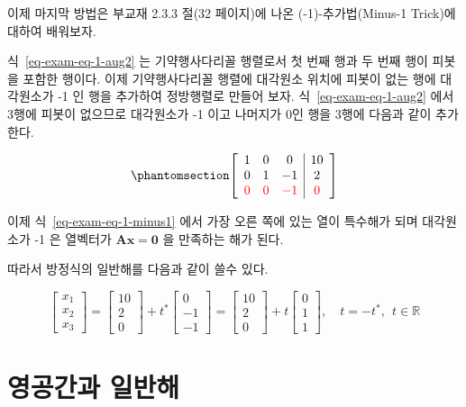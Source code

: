 \documentclass[
  11pt,
  a4paper,
  oneside]{scrbook}
\newcommand{\RR}{\mathbb{R}}
\theoremstyle{definition}
\theoremstyle{definition}
\theoremstyle{plain}
\theoremstyle{remark}
\begin{document}
이제 마지막 방법은 부교재 2.3.3 절(32 페이지)에 나온 (-1)-추가법(Minus-1
Trick)에 대하여 배워보자.

식~\ref{eq-exam-eq-1-aug2} 는 기약행사다리꼴 행렬로서 첫 번째 행과 두
번째 행이 피봇을 포함한 행이다. 이제 기약행사다리꼴 행렬에 대각원소
위치에 피봇이 없는 행에 대각원소가 -1 인 행을 추가하여 정방행렬로 만들어
보자. 식~\ref{eq-exam-eq-1-aug2} 에서 3행에 피봇이 없으므로 대각원소가
-1 이고 나머지가 0인 행을 3행에 다음과 같이 추가한다.

\begin{equation}\phantomsection\label{eq-exam-eq-1-minus1}{
\left[\begin{array}{ccc|c}
1 & 0 & 0 & 10\\
0 & 1  & -1 & 2 \\
\color{red}{0} &  \color{red}{0} & \color{red}{-1} & \color{red}{0} 
\end{array}\right]
}\end{equation}

이제 식~\ref{eq-exam-eq-1-minus1} 에서 가장 오른 쪽에 있는 열이 특수해가
되며 대각원소가 -1 은 열벡터가 \(\pmb A \pmb x = \pmb 0\) 을 만족하는
해가 된다.

따라서 방정식의 일반해를 다음과 같이 쓸수 있다.

\[
\begin{bmatrix}
x_1 \\
x_2 \\
x_3 
\end{bmatrix}
=
\begin{bmatrix}
10 \\
2 \\
0 
\end{bmatrix}+
t^*
\begin{bmatrix}
0 \\
-1 \\
-1 
\end{bmatrix}
=
\begin{bmatrix}
10 \\
2 \\
0 
\end{bmatrix}+
t
\begin{bmatrix}
0 \\
1 \\
1 
\end{bmatrix},
 \quad t=-t^*, ~~ t \in \RR
\]

\section{영공간과
일반해}\label{uxc601uxacf5uxac04uxacfc-uxc77cuxbc18uxd574}
\end{document}
